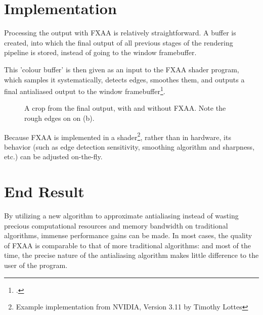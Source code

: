 \documentclass[11pt, oneside]{report}
\begin{document}
\section{Implementation}
Processing the output with \gls{FXAA} is relatively straightforward. A buffer is created, into which the final output of all previous stages of the rendering pipeline is stored, instead of going to the window framebuffer.

This 'colour buffer' is then given as an input to the \gls{FXAA} \gls{shader} program, which samples it systematically, detects edges, smoothes them, and outputs a final antialiased output to the window framebuffer\footcite{nvidia-fxaa}.

\begin{figure}[!htbp]
  \centering
  \hfill
  \caption{A crop from the final output, with and without FXAA. Note the rough edges on on (b).}
\end{figure}

Because \gls{FXAA} is implemented in a shader\footnote{Example implementation from NVIDIA, Version 3.11 by Timothy Lottes}, rather than in hardware, its behavior (such as edge detection sensitivity, smoothing algorithm and sharpness, etc.) can be adjusted on-the-fly. 

\section{End Result}
By utilizing a new algorithm to approximate antialiasing instead of wasting precious computational resources and \gls{memory bandwidth} on traditional algorithms, immense performance gains can be made. In most cases, the quality of \gls{FXAA} is comparable to that of more traditional algorithms: and most of the time, the precise nature of the antialiasing algorithm makes little difference to the user of the program.
\end{document}
